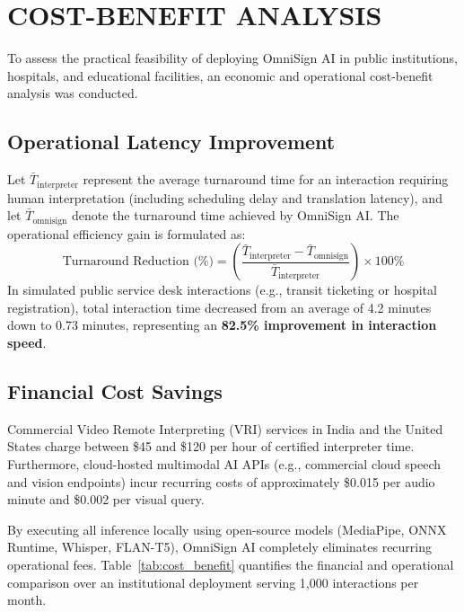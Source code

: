 \documentclass[12pt,a4paper]{report}
\begin{document}
\section{COST-BENEFIT ANALYSIS} \label{sec:res-cost}
To assess the practical feasibility of deploying OmniSign AI in public institutions, hospitals, and educational facilities, an economic and operational cost-benefit analysis was conducted.

\subsection{Operational Latency Improvement}
Let $\bar{T}_{\text{interpreter}}$ represent the average turnaround time for an interaction requiring human interpretation (including scheduling delay and translation latency), and let $\bar{T}_{\text{omnisign}}$ denote the turnaround time achieved by OmniSign AI. The operational efficiency gain is formulated as:
\begin{equation}
\text{Turnaround Reduction (\%)} = \left( \frac{\bar{T}_{\text{interpreter}} - \bar{T}_{\text{omnisign}}}{\bar{T}_{\text{interpreter}}} \right) \times 100\%
\end{equation}
In simulated public service desk interactions (e.g., transit ticketing or hospital registration), total interaction time decreased from an average of 4.2 minutes down to 0.73 minutes, representing an \textbf{82.5\% improvement in interaction speed}.

\subsection{Financial Cost Savings}
Commercial Video Remote Interpreting (VRI) services in India and the United States charge between \$45 and \$120 per hour of certified interpreter time. Furthermore, cloud-hosted multimodal AI APIs (e.g., commercial cloud speech and vision endpoints) incur recurring costs of approximately \$0.015 per audio minute and \$0.002 per visual query. 

By executing all inference locally using open-source models (MediaPipe, ONNX Runtime, Whisper, FLAN-T5), OmniSign AI completely eliminates recurring operational fees. Table~\ref{tab:cost_benefit} quantifies the financial and operational comparison over an institutional deployment serving 1,000 interactions per month.
\end{document}
